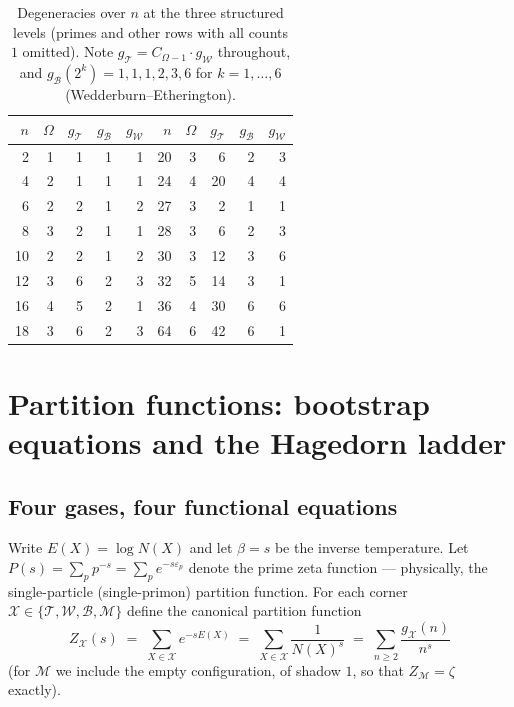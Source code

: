 \documentclass[11pt]{article}
\newcommand{\cT}{\mathcal{T}}   %
\newcommand{\cW}{\mathcal{W}}   %
\newcommand{\cB}{\mathcal{B}}   %
\newcommand{\cM}{\mathcal{M}}   %
\numberwithin{equation}{section}
\theoremstyle{plain}
\theoremstyle{definition}
\theoremstyle{remark}
\begin{document}
\begin{table}[ht]
\centering\small
\begin{tabular}{@{}rrrrr@{\hspace{9mm}}rrrrr@{}}
\toprule
$n$ & $\Omega$ & $g_\cT$ & $g_\cB$ & $g_\cW$ &
$n$ & $\Omega$ & $g_\cT$ & $g_\cB$ & $g_\cW$ \\
\midrule
 2 & 1 &  1 & 1 & 1 &  20 & 3 &  6 & 2 & 3 \\
 4 & 2 &  1 & 1 & 1 &  24 & 4 & 20 & 4 & 4 \\
 6 & 2 &  2 & 1 & 2 &  27 & 3 &  2 & 1 & 1 \\
 8 & 3 &  2 & 1 & 1 &  28 & 3 &  6 & 2 & 3 \\
10 & 2 &  2 & 1 & 2 &  30 & 3 & 12 & 3 & 6 \\
12 & 3 &  6 & 2 & 3 &  32 & 5 & 14 & 3 & 1 \\
16 & 4 &  5 & 2 & 1 &  36 & 4 & 30 & 6 & 6 \\
18 & 3 &  6 & 2 & 3 &  64 & 6 & 42 & 6 & 1 \\
\bottomrule
\end{tabular}
\caption{Degeneracies over $n$ at the three structured levels (primes and other rows
with all counts $1$ omitted). Note $g_\cT = C_{\Omega-1}\cdot g_\cW$ throughout, and
$g_\cB(2^k) = 1,1,1,2,3,6$ for $k=1,\dots,6$ (Wedderburn--Etherington).}
\label{tab:degeneracies}
\end{table}

\section{Partition functions: bootstrap equations and the Hagedorn ladder}
\label{sec:zeta}

\subsection{Four gases, four functional equations}

Write $E(X) = \log N(X)$ and let $\beta = s$ be the inverse temperature. Let
$P(s) = \sum_p p^{-s} = \sum_p e^{-s\varepsilon_p}$ denote the prime zeta function ---
physically, the single-particle (single-primon) partition function. For each corner
$\mathcal{X} \in \{\cT, \cW, \cB, \cM\}$ define the canonical partition function
\[
Z_{\mathcal X}(s) \;=\; \sum_{X \in \mathcal X} e^{-s E(X)}
\;=\; \sum_{X \in \mathcal X} \frac{1}{N(X)^{s}}
\;=\; \sum_{n \ge 2} \frac{g_{\mathcal X}(n)}{n^{s}}
\]
(for $\cM$ we include the empty configuration, of shadow $1$, so that
$Z_\cM = \zeta$ exactly).
\end{document}
